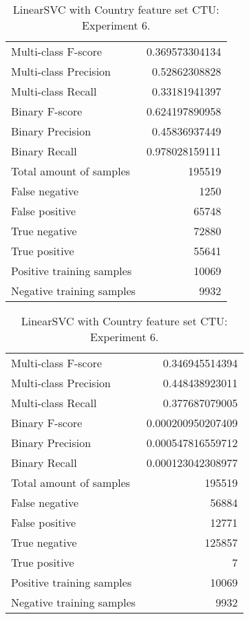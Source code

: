 \begin{table}[H]
\begin{minipage}{0.5\textwidth}
\caption{LinearSVC with Country feature set CTU: Experiment 5.}
\centering
\begin{tabular}{l r}
\toprule
Multi-class F-score & 0.369573304134 \\
Multi-class Precision & 0.52862308828 \\
Multi-class Recall & 0.33181941397 \\
\midrule
Binary F-score & 0.624197890958 \\
Binary Precision & 0.45836937449 \\
Binary Recall & 0.978028159111 \\
\midrule
Total amount of samples & 195519 \\
False negative & 1250 \\
False positive & 65748 \\
True negative & 72880 \\
True positive & 55641 \\
\midrule
Positive training samples & 10069 \\
Negative training samples & 9932 \\
\bottomrule
\end{tabular}
\end{minipage}
\hfillx
\begin{minipage}{0.5\textwidth}
\caption{LinearSVC with Country feature set CTU: Experiment 6.}
\centering
\begin{tabular}{l r}
\toprule
Multi-class F-score & 0.346945514394 \\
Multi-class Precision & 0.448438923011 \\
Multi-class Recall & 0.377687079005 \\
\midrule
Binary F-score & 0.000200950207409 \\
Binary Precision & 0.000547816559712 \\
Binary Recall & 0.000123042308977 \\
\midrule
Total amount of samples & 195519 \\
False negative & 56884 \\
False positive & 12771 \\
True negative & 125857 \\
True positive & 7 \\
\midrule
Positive training samples & 10069 \\
Negative training samples & 9932 \\
\bottomrule
\end{tabular}
\end{minipage}
\end{table}
